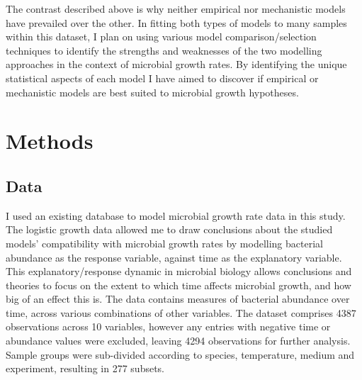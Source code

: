 \documentclass[11pt, a4paper, titlepage]{article}
\begin{document}
    The contrast described above is why neither empirical nor mechanistic models have prevailed over the other. In fitting both types of models to many samples within this dataset, I plan on using various model comparison/selection techniques to identify the strengths and weaknesses of the two modelling approaches in the context of microbial growth rates. By identifying the unique statistical aspects of each model I have aimed to discover if empirical or mechanistic models are best suited to microbial growth hypotheses.

    \section*{Methods}

    \subsection*{Data}
    I used an existing database to model microbial growth rate data in this study. The logistic growth data allowed me to draw conclusions about the studied models' compatibility with microbial growth rates by modelling bacterial abundance as the response variable, against time as the explanatory variable. This explanatory/response dynamic in microbial biology allows conclusions and theories to focus on the extent to which time affects microbial growth, and how big of an effect this is. The data contains measures of bacterial abundance over time, across various combinations of other variables. The dataset comprises 4387 observations across 10 variables, however any entries with negative time or abundance values were excluded, leaving 4294 observations for further analysis. Sample groups were sub-divided according to species, temperature, medium and experiment, resulting in 277 subsets. 
\end{document}
